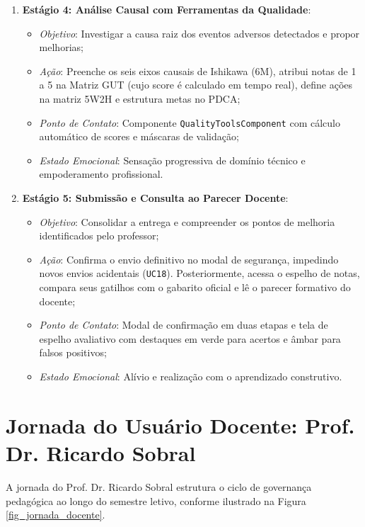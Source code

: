 \begin{enumerate}
    \item \textbf{Estágio 4: Análise Causal com Ferramentas da Qualidade}:
    \begin{itemize}
        \item \textit{Objetivo}: Investigar a causa raiz dos eventos adversos detectados e propor melhorias;
        \item \textit{Ação}: Preenche os seis eixos causais de Ishikawa (6M), atribui notas de 1 a 5 na Matriz GUT (cujo score é calculado em tempo real), define ações na matriz 5W2H e estrutura metas no PDCA;
        \item \textit{Ponto de Contato}: Componente \texttt{QualityToolsComponent} com cálculo automático de scores e máscaras de validação;
        \item \textit{Estado Emocional}: Sensação progressiva de domínio técnico e empoderamento profissional.
    \end{itemize}

    \item \textbf{Estágio 5: Submissão e Consulta ao Parecer Docente}:
    \begin{itemize}
        \item \textit{Objetivo}: Consolidar a entrega e compreender os pontos de melhoria identificados pelo professor;
        \item \textit{Ação}: Confirma o envio definitivo no modal de segurança, impedindo novos envios acidentais (\texttt{UC18}). Posteriormente, acessa o espelho de notas, compara seus gatilhos com o gabarito oficial e lê o parecer formativo do docente;
        \item \textit{Ponto de Contato}: Modal de confirmação em duas etapas e tela de espelho avaliativo com destaques em verde para acertos e âmbar para falsos positivos;
        \item \textit{Estado Emocional}: Alívio e realização com o aprendizado construtivo.
    \end{itemize}
\end{enumerate}

\section{Jornada do Usuário Docente: Prof. Dr. Ricardo Sobral}
\label{sec_jornada_docente}

A jornada do Prof. Dr. Ricardo Sobral estrutura o ciclo de governança pedagógica ao longo do semestre letivo, conforme ilustrado na Figura \ref{fig_jornada_docente}.

